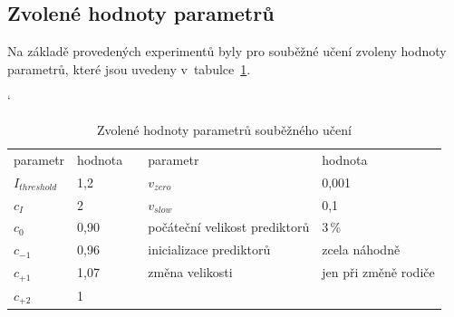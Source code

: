 \subsection{Zvolené hodnoty parametrů}

Na základě provedených experimentů byly pro souběžné učení zvoleny hodnoty parametrů, které jsou uvedeny v~tabulce~\ref{tabParams}.


\begin{table}[h]
    \caption{Zvolené hodnoty parametrů souběžného učení}
    \renewcommand{\arraystretch}{1.2}
    \catcode`
    \centering
    \begin{tabular}{|l|l|c|l|l|}
        \cline{1-2}\cline{4-5}
        parametr & hodnota & & parametr & hodnota \\
        \cline{1-2}\cline{4-5}
        $I_\mathit{threshold}$ & 1,2   & & $v_\mathit{zero}$ & 0,001 \\
        $c_I$ & 2                      & & $v_\mathit{slow}$ & 0,1 \\
        $c_0$ & 0,90                   & & počáteční velikost prediktorů & 3\,\% \\
        $c_{-1}$ & 0,96                & & inicializace prediktorů & zcela náhodně \\
        $c_{+1}$ & 1,07                & & změna velikosti & jen při změně rodiče \\
        $c_{+2}$ & 1                   & & &\\
        \cline{1-2}\cline{4-5}
    \end{tabular}
    \label{tabParams}
\end{table}



